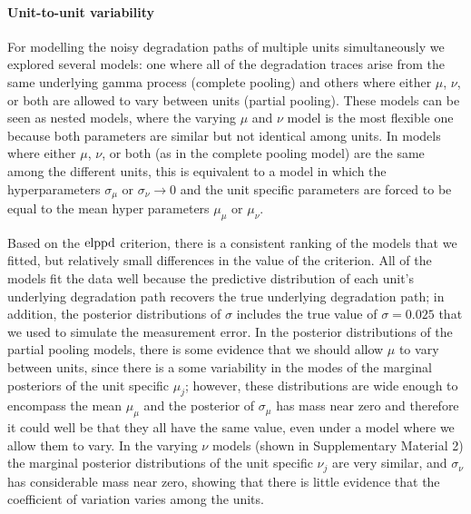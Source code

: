 \documentclass{article}
\begin{document}
\paragraph*{Unit-to-unit variability} For modelling the noisy degradation paths of multiple units simultaneously we explored several models: one where all of the degradation traces arise from the same underlying gamma process (complete pooling) and others where either $\mu$, $\nu$, or both are allowed to vary between units (partial pooling). These models can be seen as nested models, where the varying $\mu$ and $\nu$ model is the most flexible one because both parameters are similar but not identical among units. In models where either $\mu$, $\nu$, or both (as in the complete pooling model) are the same among the different units, this is equivalent to a model in which the hyperparameters $\sigma_\mu$ or $\sigma_\nu \longrightarrow 0$ and the unit specific parameters are forced to be equal to the mean hyper parameters $\mu_\mu$ or $\mu_\nu$.

Based on the $\hbox{elppd}$ criterion, there is a consistent ranking of the models that we fitted, but relatively small differences in the value of the criterion. All of the models fit the data well because the predictive distribution of each unit's underlying degradation path recovers the true underlying degradation path; in addition, the posterior distributions of $\sigma$ includes the true value of $\sigma = 0.025$ that we used to simulate the measurement error. In the posterior distributions of the partial pooling models, there is some evidence that we should allow $\mu$ to vary between units, since there is a some variability in the modes of the marginal posteriors of the unit specific $\mu_j$; however, these distributions are wide enough to encompass the mean $\mu_\mu$ and the posterior of $\sigma_\mu$ has mass near zero and therefore it could well be that they all have the same value, even under a model where we allow them to vary. In the varying $\nu$ models (shown in Supplementary Material 2) the marginal posterior distributions of the unit specific $\nu_j$ are very similar, and $\sigma_\nu$ has considerable mass near zero, showing that there is little evidence that the coefficient of variation varies among the units.
\end{document}
